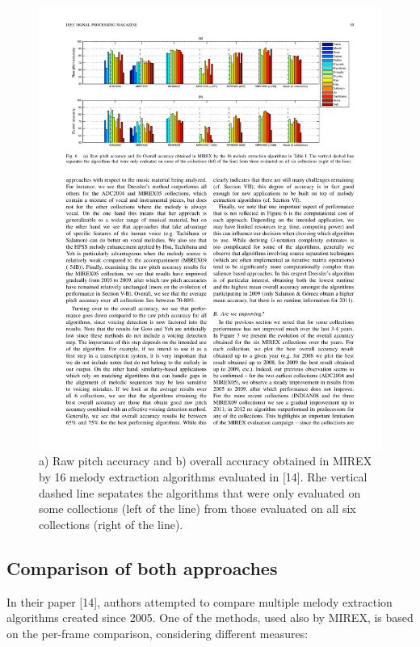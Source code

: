 \begin{figure}[h!]
  \centering
    \includegraphics[width=\textwidth]{Figures/comparisonall}
      \caption{a) Raw pitch accuracy and b) overall accuracy obtained in MIREX by 16 melody extraction algorithms evaluated in [14]. Rhe vertical dashed line sepatates the algorithms that were only evaluated on some collections (left of the line) from those evaluated on all six collections (right of the line).}
\end{figure}

\subsection{Comparison of both approaches}

In their paper [14], authors attempted to compare multiple melody extraction algorithms created since 2005. One of the methods, used also by MIREX, is based on the per-frame comparison, considering different measures:

